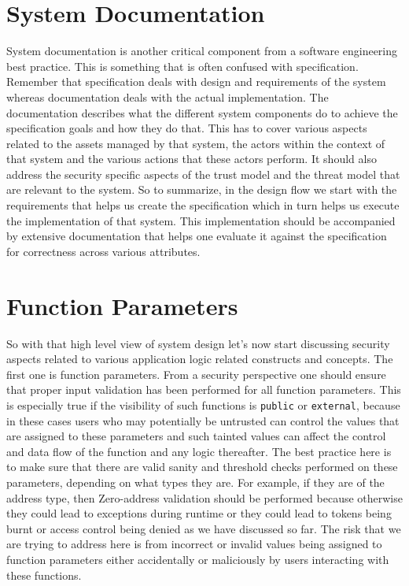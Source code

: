 \section{System Documentation}
System documentation is another critical component from a software engineering best practice. This is something that is often confused with specification. Remember that specification deals with design and requirements of the system whereas documentation deals with the actual implementation. The documentation describes what the different system components do to achieve the specification goals and how they do that. This has to cover various aspects related to the assets managed by that system, the actors within the context of that system and the various actions that these actors perform. It should also address the security specific aspects of the trust model and the threat model that are relevant to the system. So to summarize, in the design flow we start with the requirements that helps us create the specification which in turn helps us execute the implementation of that system. This implementation should be accompanied by extensive documentation that helps one evaluate it against the specification for correctness across various attributes.

\section{Function Parameters}
So with that high level view of system design let's now start discussing security aspects related to various application logic related constructs and concepts. The first one is function parameters. From a security perspective one should ensure that proper input validation has been performed for all function parameters. This is especially true if the visibility of such functions is \verb|public| or \verb|external|, because in these cases users who may potentially be untrusted can control the values that are assigned to these parameters and such tainted values can affect the control and data flow of the function and any logic thereafter. The best practice here is to make sure that there are valid sanity and threshold checks performed on these parameters, depending on what types they are. For example, if they are of the address type, then Zero-address validation should be performed because otherwise they could lead to exceptions during runtime or they could lead to tokens being burnt or access control being denied as we have discussed so far. The risk that we are trying to address here is from incorrect or invalid values being assigned to function parameters either accidentally or maliciously by users interacting with these functions.

